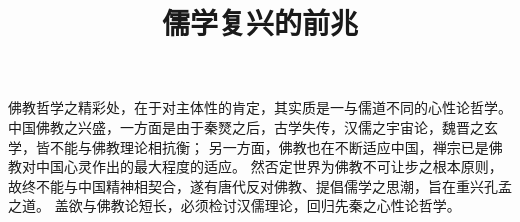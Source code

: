 \documentclass[11pt]{article}
\title{儒学复兴的前兆}
\date{}
\begin{document}
  \maketitle

  \linenumbers
  
佛教哲学之精彩处，在于对主体性的肯定，其实质是一与儒道不同的心性论哲学。
中国佛教之兴盛，一方面是由于秦燹之后，古学失传，汉儒之宇宙论，魏晋之玄学，皆不能与佛教理论相抗衡；
另一方面，佛教也在不断适应中国，禅宗已是佛教对中国心灵作出的最大程度的适应。
然否定世界为佛教不可让步之根本原则，故终不能与中国精神相契合，遂有唐代反对佛教、提倡儒学之思潮，旨在重兴孔孟之道。
盖欲与佛教论短长，必须检讨汉儒理论，回归先秦之心性论哲学。
\end{document}
